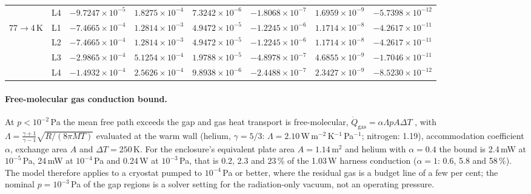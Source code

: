 \documentclass[11pt]{article}
\begin{document}
\begin{table}[H]
\begin{tabular}{l l r r r r r r}
 & L4 & $-9.7247\times10^{-5}$ & $1.8275\times10^{-4}$ & $7.3242\times10^{-6}$ & $-1.8068\times10^{-7}$ & $1.6959\times10^{-9}$ & $-5.7398\times10^{-12}$ \\
77$\to$4\,K & L1 & $-7.4665\times10^{-4}$ & $1.2814\times10^{-3}$ & $4.9472\times10^{-5}$ & $-1.2245\times10^{-6}$ & $1.1714\times10^{-8}$ & $-4.2617\times10^{-11}$ \\
 & L2 & $-7.4665\times10^{-4}$ & $1.2814\times10^{-3}$ & $4.9472\times10^{-5}$ & $-1.2245\times10^{-6}$ & $1.1714\times10^{-8}$ & $-4.2617\times10^{-11}$ \\
 & L3 & $-2.9865\times10^{-4}$ & $5.1254\times10^{-4}$ & $1.9788\times10^{-5}$ & $-4.8978\times10^{-7}$ & $4.6855\times10^{-9}$ & $-1.7046\times10^{-11}$ \\
 & L4 & $-1.4932\times10^{-4}$ & $2.5626\times10^{-4}$ & $9.8938\times10^{-6}$ & $-2.4488\times10^{-7}$ & $2.3427\times10^{-9}$ & $-8.5230\times10^{-12}$ \\
\bottomrule
\end{tabular}\end{table}

\paragraph{Free-molecular gas conduction bound.} At $p<10^{-2}$\,Pa the mean free path
exceeds the gap and gas heat transport is free-molecular,
$\dot Q_{\mathrm{gas}}=\alpha\Lambda pA\Delta T$ \citep{37-Corruccini1959FreeMolecular}, with
$\Lambda=\frac{\gamma+1}{\gamma-1}\sqrt{R/(8\pi MT)}$ evaluated at the warm wall (helium,
$\gamma=5/3$: $\Lambda=2.10$\,W\,m$^{-2}$\,K$^{-1}$\,Pa$^{-1}$; nitrogen: 1.19),
accommodation coefficient $\alpha$, exchange area $A$ and $\Delta T=250$\,K. For the
enclosure's equivalent plate area $A=1.14$\,m$^2$ and helium with $\alpha=0.4$ the bound is
2.4\,mW at $10^{-5}$\,Pa, 24\,mW at $10^{-4}$\,Pa and 0.24\,W at $10^{-3}$\,Pa, that is 0.2,
2.3 and 23\,\% of the 1.03\,W harness conduction ($\alpha=1$: 0.6, 5.8 and 58\,\%). The model
therefore applies to a cryostat pumped to $10^{-4}$\,Pa or better, where the residual gas is a
budget line of a few per cent; the nominal $p=10^{-3}$\,Pa of the gap regions is a solver
setting for the radiation-only vacuum, not an operating pressure.
\end{document}
